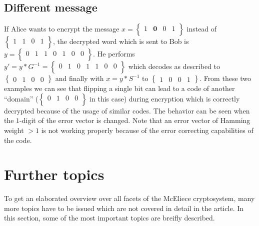 \subsection{Different message}
If Alice wants to encrypt the message
	$
	x =
	\begin{Bmatrix}
	1 & \textbf{0} & 0 & 1 \\
	\end{Bmatrix}
	$  instead of 	$
	\begin{Bmatrix}
	1 & 1 & 0 & 1 \\
	\end{Bmatrix}
	$, the decrypted word which is sent to Bob is 
	$
	y = 
	\begin{Bmatrix}
	0 & 1 & 1 & 0 & 1 & 0 & 0 \\
	\end{Bmatrix}
	$. He performs
	$
	y' = y*G^{-1} =
	\begin{Bmatrix}
	0 & 1 & 0 & 1 & 1 & 0 & 0 \\
	\end{Bmatrix}
	$ which decodes as described to 
$
\begin{Bmatrix}
0 & 1 & 0 & 0
\end{Bmatrix}
$ and finally with $x = y * S^{-1}$ to
$
\begin{Bmatrix}
1 & 0 & 0 & 1
\end{Bmatrix}
$.
From these two examples we can see that flipping a single bit can lead to a code of another ``domain'' ($
\begin{Bmatrix}
0 & 1 & 0 & 0 \\
\end{Bmatrix}
$ in this case) during encryption which is correctly decrypted because of the usage of similar codes.
The behavior can be seen when the $1$-digit of the error vector is changed. Note that an error vector of Hamming weight $> 1$ is not working properly because of the error correcting capabilities of the code. 

\section{Further topics}
\label{further_topics}
To get an elaborated overview over all facets of the McEliece cryptosystem, many more topics have to be issued which are not covered in detail in the article. In this section, some of the most important topics are breifly described. 


